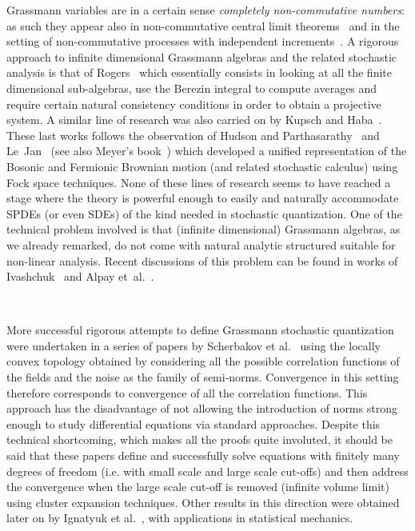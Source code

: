 \documentclass[11pt]{article}
\newcommand{\tmtextit}[1]{{\itshape{#1}}}
\begin{document}
Grassmann variables are in a certain sense \tmtextit{completely
non-commutative numbers}: as such they appear also in non-commutative central
limit theorems~{\cite{von_waldenfels_non_commutative_1986}} and in the setting
of non-commutative processes with independent
increments~{\cite{schurman_quantum_1991,bozejko_interpolations_1996}}. A
rigorous approach to infinite dimensional Grassmann algebras and the related
stochastic analysis is that of
Rogers~{\cite{rogers_graded_1986,rogers_stochastic_1992_I,rogers_stochastic_1992_II,rogers_path_1995,leppard_feynman_kac_2001}}
which essentially consists in looking at all the finite dimensional
sub-algebras, use the Berezin integral to compute averages and require certain
natural consistency conditions in order to obtain a projective system. A
similar line of research was also carried on by Kupsch and
Haba~{\cite{kupsch_fermionic_1993,haba_supersymmetry_1995}}. These last works
follows the observation of Hudson and
Parthasarathy~{\cite{hudson_unification_1986}} and
Le~Jan~{\cite{le_jan_temps_1987}} (see also Meyer's book~{\cite{Meyerbook}})
which developed a unified representation of the Bosonic and Fermionic Brownian
motion (and related stochastic calculus) using Fock space techniques. None of
these lines of research seems to have reached a stage where the theory is
powerful enough to easily and naturally accommodate SPDEs (or even SDEs) of
the kind needed in stochastic quantization. One of the technical problem
involved is that (infinite dimensional) Grassmann algebras, as we already
remarked, do not come with natural analytic structured suitable for non-linear
analysis. Recent discussions of this problem can be found in works of
Ivashchuk~{\cite{ivashchuk_infinite_dimensional_2000}} and Alpay
et~al.~{\cite{alpay_distribution_2019}}.

\

More successful rigorous attempts to define Grassmann stochastic quantization
were undertaken in a series of papers by Scherbakov et
al.~{\cite{shcherbakov_elements_1993,shcherbakov_elements_1993-1,shcherbakov_elements_1993-2}}
using the locally convex topology obtained by considering all the possible
correlation functions of the fields and the noise as the family of semi-norms.
Convergence in this setting therefore corresponds to convergence of all the
correlation functions. This approach has the disadvantage of not allowing the
introduction of norms strong enough to study differential equations via
standard approaches. Despite this technical shortcoming, which makes all the
proofs quite involuted, it should be said that these papers define and
successfully solve equations with finitely many degrees of freedom (i.e. with
small scale and large scale cut-offs) and then address the convergence when
the large scale cut-off is removed (infinite volume limit) using cluster
expansion techniques. Other results in this direction were obtained later on
by Ignatyuk et al.~{\cite{ignatyuk_convergence_1993}}, with applications in
statistical mechanics.
\end{document}
